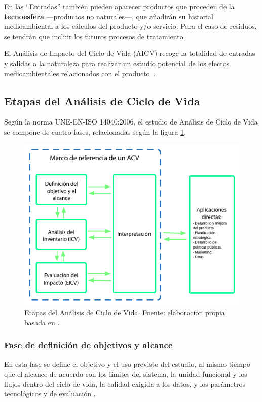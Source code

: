 En las ``Entradas'' también pueden aparecer productos que proceden de la \textbf{tecnoesfera} —productos no naturales—, que añadirán su historial medioambiental a los cálculos del producto y/o servicio. Para el caso de residuos, se tendrán que incluir los futuros procesos de tratamiento.

El Análisis de Impacto del Ciclo de Vida (AICV) recoge la totalidad de entradas y salidas a la naturaleza para realizar un estudio potencial de los efectos medioambientales relacionados con el producto \cite{iso14040}.

\subsection{Etapas del Análisis de Ciclo de Vida}\label{sec:etapaslca}

Según la norma UNE-EN-ISO 14040:2006, el estudio de Análisis de Ciclo de Vida se compone de cuatro fases, relacionadas según la figura \ref{fig:etapaslca}.

\begin{figure}[!htb]
\centering
\includegraphics[width=12cm]{img/etapas_lca.png}
\caption[Etapas del Análisis de Ciclo de Vida.]{Etapas del Análisis de Ciclo de Vida. Fuente: elaboración propia basada en \protect\cite{iso14040}.}
\label{fig:etapaslca}
\end{figure}

\subsubsection{Fase de definición de objetivos y alcance}
En esta fase se define el objetivo y el uso previsto del estudio, al mismo tiempo que el alcance de acuerdo con los límites del sistema, la unidad funcional y los flujos dentro del ciclo de vida, la calidad exigida a los datos, y los parámetros tecnológicos y de evaluación \cite{iso14040,ihobeeco}.

